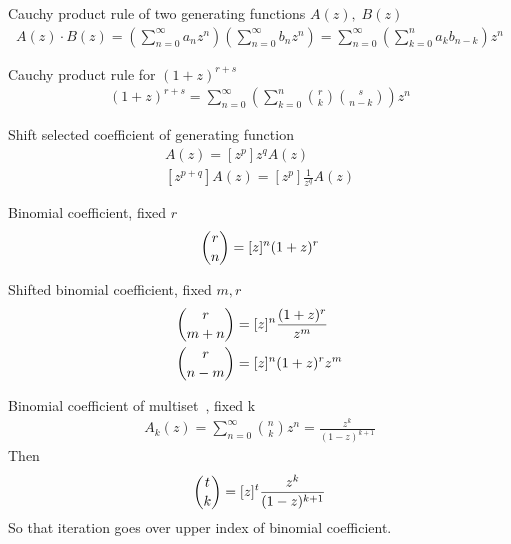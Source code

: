 ﻿\begin{identity}
    Cauchy product rule of two generating functions $A(z), \; B(z)$
    \begin{align*}
        A(z) \cdot B(z) = \left( \sum_{n=0}^{\infty} a_n z^n \right) \left( \sum_{n=0}^{\infty} b_n z^n \right)
        = \sum_{n=0}^{\infty} \left( \sum_{k=0}^{n} a_k b_{n-k} \right) z^n
    \end{align*}
\end{identity}
\begin{identity}
    Cauchy product rule for $(1+z)^{r+s}$
    \begin{align*}
    (1 + z)
        ^{r+s} = \sum_{n=0}^{\infty} \left( \sum_{k=0}^{n} \binom{r}{k} \binom{s}{n-k} \right) z^n
    \end{align*}
\end{identity}
\begin{identity}
    Shift selected coefficient of generating function
    \begin{align*}
    [z^{p-q}]
        A(z)=[z^p] z^{q} A(z) \\
        [z^{p+q}] A(z)=[z^p] \frac{1}{z^{q}} A(z)
    \end{align*}
\end{identity}
\begin{identity}
    Binomial coefficient, fixed $r$
    \begin{align*}
        \binom{r}{n} = [z]^{n} (1+z)^r
    \end{align*}
\end{identity}
\begin{identity}
    Shifted binomial coefficient, fixed $m, r$
    \begin{align*}
        \binom{r}{m+n} &= [z]^{n} \frac{(1+z)^r}{z^m} \\
        \binom{r}{n-m} &= [z]^{n} (1+z)^r z^m \\
    \end{align*}
\end{identity}
\begin{identity}
    Binomial coefficient of multiset~\cite[eq. 8]{faris2011generating}, fixed k
    \begin{align*}
        A_k(z) = \sum_{n=0}^{\infty} \binom{n}{k} z^n = \frac{z^k}{(1-z)^{k+1}}
    \end{align*}
    Then
    \begin{align*}
        \binom{t}{k} = [z]^{t} \frac{z^k}{(1-z)^{k+1}}
    \end{align*}
    So that iteration goes over upper index of binomial coefficient.
\end{identity}
